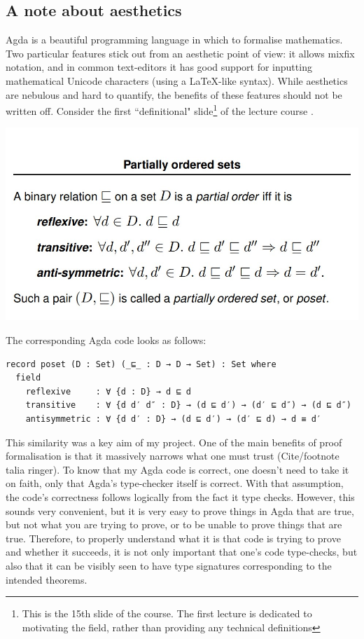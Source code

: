 \documentclass[12pt,a4paper,twoside,openright]{report}
\begin{document}
\subsection{A note about aesthetics}
Agda is a beautiful programming language in which to formalise mathematics. Two particular features stick out from an aesthetic point of view: it allows mixfix notation, and in common text-editors it has good support for inputting mathematical Unicode characters (using a \LaTeX-like syntax). While aesthetics are nebulous and hard to quantify, the benefits of these features should not be written off. Consider the first ``definitional" slide\footnote{This is the 15th slide of the course. The first lecture is dedicated to motivating the field, rather than providing any technical definitions} of the lecture course \cite{Course}.
\begin{center}
\includegraphics[scale = 0.7]{figs/poset_def}
\end{center}

The corresponding Agda code looks as follows:
\begin{verbatim}
record poset (D : Set) (_⊑_ : D → D → Set) : Set where
  field
    reflexive     : ∀ {d : D} → d ⊑ d 
    transitive    : ∀ {d d′ d″ : D} → (d ⊑ d′) → (d′ ⊑ d″) → (d ⊑ d″)
    antisymmetric : ∀ {d d′ : D} → (d ⊑ d′) → (d′ ⊑ d) → d ≡ d′
\end{verbatim}
This similarity was a key aim of my project. One of the main benefits of proof formalisation is that it massively narrows what one must trust (Cite/footnote talia ringer). To know that my Agda code is correct, one doesn't need to take it on faith, only that Agda's type-checker itself is correct. With that assumption, the code's correctness follows logically from the fact it type checks. However, this sounds very convenient, but it is very easy to prove things in Agda that are true, but not what you are trying to prove, or to be unable to prove things that are true. Therefore, to properly understand what it is that code is trying to prove and whether it succeeds, it is not only important that one's code type-checks, but also that it can be visibly seen to have type signatures corresponding to the intended theorems. 
\end{document}
